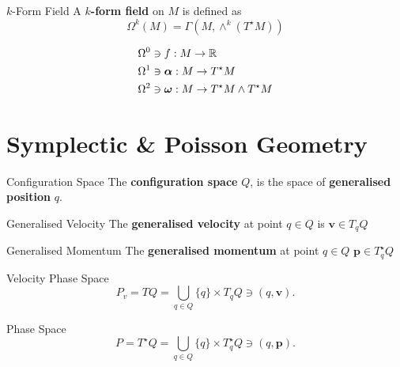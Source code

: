 \documentclass{beamer}
\begin{document}
\begin{frame}{}
  \begin{block}{\(k\)-Form Field}
    A \textbf{\(k\)-form field} on \(M\) is defined as
    \begin{equation}
      \Omega ^{k} (M) = \Gamma (M, \wedge ^{k} (T ^{\star} M))
    \end{equation}
  \end{block}

  \begin{example}
    \begin{equation}
      \begin{split}
        &\Omega ^{0} \ni f: M \to \mathbb{R}\\
        &\Omega ^{1} \ni \boldsymbol{\alpha} : M \to T ^{\star} M\\
        &\Omega ^{2} \ni \boldsymbol{\omega} : M \to T ^{\star} M \wedge T ^{\star} M
      \end{split}
    \end{equation}
  \end{example}
\end{frame}

\section{Symplectic \& Poisson Geometry}
\begin{frame}{}
  \begin{block}{Configuration Space}
    The \textbf{configuration space} \(Q\), is the space of \textbf{generalised position} \(q\).
  \end{block}

  \begin{block}{Generalised Velocity}
    The \textbf{generalised velocity} at point \(q \in Q\) is \(\boldsymbol{v} \in T _{q} Q\)
  \end{block}

  \begin{block}{Generalised Momentum}
    The \textbf{generalised momentum} at point \(q \in Q\) \(\boldsymbol{p} \in T _{q} ^{\star} Q\)
  \end{block}
\end{frame}
\begin{frame}{}
  \begin{block}{Velocity Phase Space}
    \begin{equation}
      P _{v} = T Q = \bigcup _{q \in Q} \{q\} \times T _{q} Q \ni (q, \boldsymbol{v}).
    \end{equation}
  \end{block}

  \begin{block}{Phase Space}
    \begin{equation}
      P = T ^{\star} Q = \bigcup _{q \in Q} \{q\} \times T _{q} ^{\star} Q \ni (q, \boldsymbol{p}).
    \end{equation}
  \end{block}
\end{frame}
\end{document}
